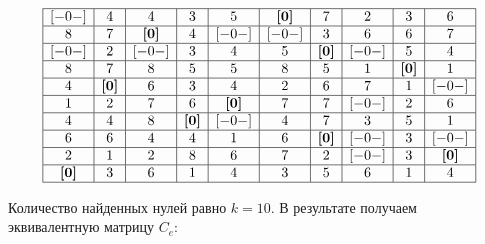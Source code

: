 \documentclass[17pt]{extarticle}
\begin{document}
\[
    \begin{array}{|*{10}{c|}}
        \hline
        [-0-]        & 4            & 4            & 3            & 5            & \textbf{[0]} & 7            & 2     & 3            & 6            \\
        \hline
        8            & 7            & \textbf{[0]} & 4            & [-0-]        & [-0-]        & 3            & 6     & 6            & 7            \\
        \hline
        [-0-]        & 2            & [-0-]        & 3            & 4            & 5            & \textbf{[0]} & [-0-] & 5            & 4            \\
        \hline
        8            & 7            & 8            & 5            & 5            & 8            & 5            & 1     & \textbf{[0]} & 1            \\
        \hline
        4            & \textbf{[0]} & 6            & 3            & 4            & 2            & 6            & 7     & 1            & [-0-]        \\
        \hline
        1            & 2            & 7            & 6            & \textbf{[0]} & 7            & 7            & [-0-] & 2            & 6            \\
        \hline
        4            & 4            & 8            & \textbf{[0]} & [-0-]        & 4            & 7            & 3     & 5            & 1            \\
        \hline
        6            & 6            & 4            & 4            & 1            & 6            & \textbf{[0]} & [-0-] & 3            & [-0-]        \\
        \hline
        2            & 1            & 2            & 8            & 6            & 7            & 2            & [-0-] & 3            & \textbf{[0]} \\
        \hline
        \textbf{[0]} & 3            & 6            & 1            & 4            & 3            & 5            & 6     & 1            & 4            \\
        \hline
    \end{array}
\]

Количество найденных нулей равно \( k = 10 \). В результате получаем эквивалентную матрицу \( C_e \):
\end{document}
